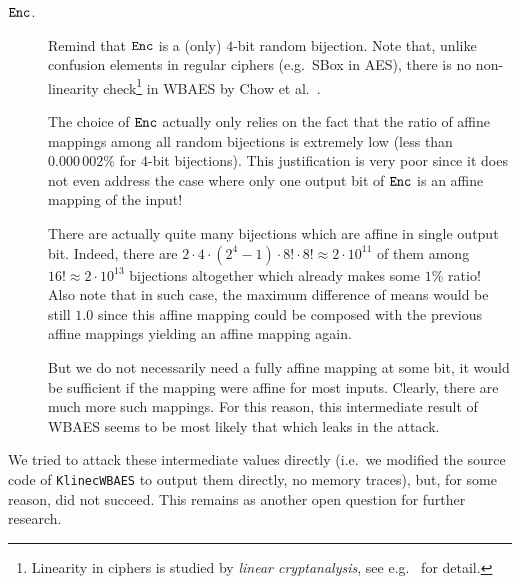 \begin{description}
	\item[$\texttt{Enc}$.] Remind that $\texttt{Enc}$ is a (only) $4$-bit random bijection. Note that, unlike confusion elements in regular ciphers (e.g.\ SBox in AES), there is no non-linearity check\footnote{Linearity in ciphers is studied by {\em linear cryptanalysis}, see e.g.\ \cite{matsui1993linear} for detail.} in WBAES by Chow et al.\ \cite{chow2002aes}.
	
	The choice of $\texttt{Enc}$ actually only relies on the fact that the ratio of affine mappings among all random bijections is extremely low (less than $0.000\,002\%$ for $4$-bit bijections). This justification is very poor since it does not even address the case where only one output bit of $\texttt{Enc}$ is an affine mapping of the input!
	
	There are actually quite many bijections which are affine in single output bit. Indeed, there are $2\cdot4\cdot(2^4-1)\cdot8!\cdot8! \approx 2\cdot10^{11}$ of them among $16! \approx 2\cdot10^{13}$ bijections altogether which already makes some $1\%$ ratio! Also note that in such case, the maximum difference of means would be still $1.0$ since this affine mapping could be composed with the previous affine mappings yielding an affine mapping again.
	
	But we do not necessarily need a fully affine mapping at some bit, it would be sufficient if the mapping were affine for most inputs. Clearly, there are much more such mappings. For this reason, this intermediate result of WBAES seems to be most likely that which leaks in the attack.
\end{description}

We tried to attack these intermediate values directly (i.e.\ we modified the source code of {\tt KlinecWBAES} to output them directly, no memory traces), but, for some reason, did not succeed.   %
This remains as another open question for further research.

